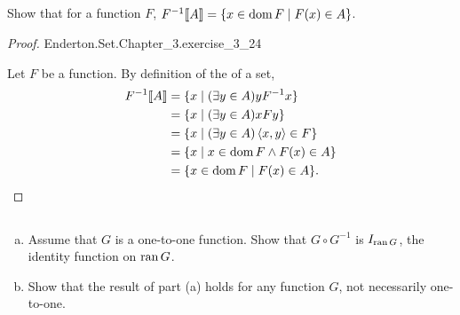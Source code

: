\documentclass{report}
\newcommand{\pair}[1]{\left< #1 \right>}
\begin{document}
\subsection{}%

Show that for a function $F$,
  $F^{-1}\!\left\llbracket A\right\rrbracket = \{x \in \mathop{\text{dom}}{F} \mid F(x) \in A\}$.

\begin{proof}

    {Enderton.Set.Chapter\_3.exercise\_3\_24}

  Let $F$ be a function.
  By definition of the  of a set,
    \begin{align*}
      \img{F^{-1}}{A}
        & = \{x \mid (\exists y \in A) yF^{-1}x\} \\
        & = \{x \mid (\exists y \in A) xFy\} \\
        & = \{x \mid (\exists y \in A) \pair{x, y} \in F\} \\
        & = \{x \mid x \in \dom{F} \land F(x) \in A\} \\
        & = \{x \in \dom{F} \mid F(x) \in A\}.
    \end{align*}

\end{proof}

\subsection{}%

\begin{enumerate}[(a)]
  \item Assume that $G$ is a one-to-one function.
    Show that $G \circ G^{-1}$ is $I_{\mathop{\text{ran}}{G}}$, the identity function on
      $\mathop{\text{ran}}{G}$.
  \item Show that the result of part (a) holds for any function $G$, not
    necessarily one-to-one.
\end{enumerate}
\end{document}
